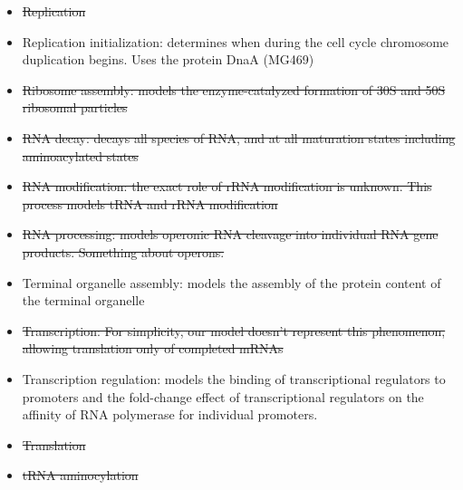\begin{itemize}
  \item \sout{Replication}
  \item Replication initialization: determines when during the cell cycle chromosome duplication begins. Uses the protein DnaA (MG469)
  \item \sout{Ribosome assembly:  models the enzyme-catalyzed formation of 30S and 50S ribosomal particles}
  \item \sout{RNA decay: decays all species of RNA, and at all maturation states including aminoacylated states}
  \item \sout{RNA modification: the exact role of rRNA modification is unknown. This process models tRNA and rRNA modification}
  \item \sout{RNA processing:  models operonic RNA cleavage into individual RNA gene products. Something about operons.}
  \item Terminal organelle assembly: models the assembly of the protein content of the terminal organelle
  \item \sout{Transcription: For simplicity, our model doesn’t represent this phenomenon, allowing translation only of completed mRNAs}
  \item Transcription regulation: models the binding of transcriptional regulators to promoters and the fold-change effect of transcriptional regulators on the affinity of RNA polymerase for individual promoters.
  \item \sout{Translation}
  \item \sout{tRNA aminocylation}
\end{itemize}